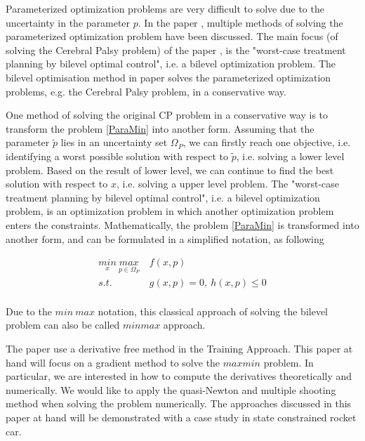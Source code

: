 	Parameterized optimization problems are very difficult to solve due to the uncertainty in the parameter $p$. In the paper \cite{MatSch22}, multiple methods of solving the parameterized optimization problem have been discussed. The main focus (of solving the Cerebral Palsy problem) of the paper \cite{MatSch22}, is the "worst-case treatment planning by bilevel optimal control", i.e. a bilevel optimization problem. The bilevel optimisation method in paper \cite{MatSch22} solves the parameterized optimization problems, e.g. the Cerebral Palsy problem, in a conservative way.
	
	
	One method of solving the original CP problem in a conservative way is to transform the problem \ref{ParaMin} into another form. Assuming that the parameter $\tilde{p}$ lies in an uncertainty set $\Omega_P$, we can firstly reach one objective, i.e. identifying a worst possible solution with respect to $\tilde{p}$, i.e. solving a lower level problem. Based on the result of lower level, we can continue to find the best solution with respect to $x$, i.e. solving a upper level problem. The "worst-case treatment planning by bilevel optimal control", i.e. a  bilevel optimization problem, is an optimization problem in which another optimization problem enters the constraints. Mathematically, the problem \ref{ParaMin} is transformed into another form, and can be formulated in a simplified notation, as following
	
	\begin{equation}
		\begin{aligned}
			\underset{x}{min} \   \underset{p \in \Omega_P}{max} & \  f(x,p) \\ 
			s.t.  & \  g(x, p) = 0, \  h(x,p)  \leq  0 \\
		\end{aligned}
		\label{minmax}
	\end{equation}
	
	
	Due to the $min \ max$ notation, this classical approach of solving the bilevel problem can also be called $min max$ approach. 
	
	The paper \cite{MatSch22} use a derivative free method in the Training Approach. This paper at hand will focus on a gradient method to solve the $maxmin$ problem.  In particular, we are interested in how to compute the derivatives theoretically and numerically.  We would like to apply the quasi-Newton and multiple shooting method when solving the problem numerically. The approaches discussed in this paper at hand will be demonstrated with a case study in state constrained rocket car. 
	
